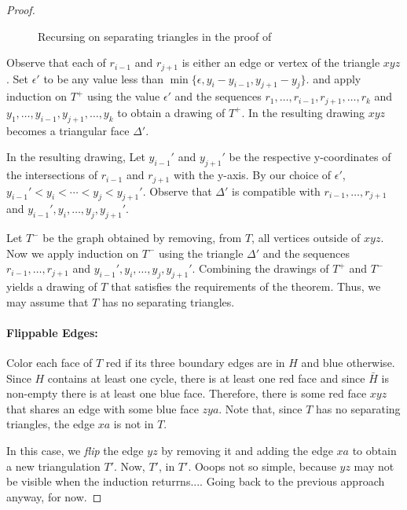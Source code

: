 \documentclass{patmorin}
\begin{document}
\begin{proof}
   \begin{figure}
      \caption{Recursing on separating triangles in the proof of
      }
   \end{figure}

   Observe that each of $r_{i-1}$ and $r_{j+1}$ is either an edge
   or vertex of the triangle $xyz$.  Set $\epsilon'$ to be any
   value less than $\min\{\epsilon,y_{i}-y_{i-1}, y_{j+1}-y_j\}$.
   and apply induction on $T^+$ using the value $\epsilon'$
   and the sequences $r_1,\ldots,r_{i-1},r_{j+1},\ldots,r_k$ and
   $y_1,\ldots,y_{i-1},y_{j+1},\ldots,y_k$ to obtain a drawing of $T^+$.
   In the resulting drawing $xyz$ becomes a triangular face $\Delta'$.

   In the resulting drawing, Let $y_{i-1}'$ and $y_{j+1}'$
   be the respective y-coordinates of the intersections of
   $r_{i-1}$ and $r_{j+1}$ with the y-axis.  By our choice of
   $\epsilon'$, $y_{i-1}'<y_i<\cdots<y_j<y_{j+1}'$.  Observe that
   $\Delta'$ is compatible with $r_{i-1},\ldots,r_{j+1}$ and
   $y_{i-1}',y_i,\ldots,y_j,y_{j+1}'$.

   Let $T^-$ be the graph obtained by removing, from $T$, all
   vertices outside of $xyz$.  Now we apply induction on $T^-$ using
   the triangle $\Delta'$ and the sequences $r_{i-1},\ldots,r_{j+1}$ and
   $y_{i-1}',y_i,\ldots,y_{j},y_{j+1}'$.  Combining the drawings of $T^+$
   and $T^-$ yields a drawing of $T$ that satisfies the requirements of
   the theorem.  Thus, we may assume that $T$ has no separating triangles.

   \paragraph{Flippable Edges:}
   Color each face of $T$ red if its three boundary edges are in $H$
   and blue otherwise. Since $H$ contains at least one cycle, there
   is at least one red face and since $\bar{H}$ is non-empty there is
   at least one blue face.  Therefore, there is some red face $xyz$
   that shares an edge with some blue face $zya$.  Note that, since $T$
   has no separating triangles, the edge $xa$ is not in $T$.

   In this case, we \emph{flip} the edge $yz$ by removing it and adding
   the edge $xa$ to obtain a new triangulation $T'$. Now, $T'$, in $T'$.
   Ooops not so simple, because $yz$ may not be visible when the induction returrns....  Going back to the previous approach anyway, for now.


\end{proof}
\end{document}
